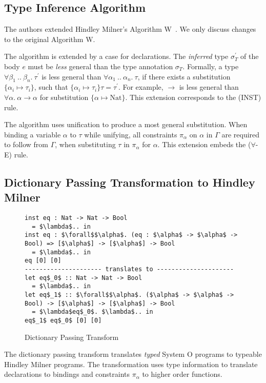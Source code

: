 \documentclass[runningheads]{llncs}
\newcommand{\snip}[1]{\footnotesize{\ttfamily{#1}}}
\begin{document}
\subsection{Type Inference Algorithm}
The authors extended Hindley Milner's Algorithm W~\cite{hm78}. We only discuss changes to the original Algorithm W.

The algorithm is extended by a case for \snip{inst} declarations. 
The \emph{inferred} type $\sigma_T^\prime$ of the body $e$ must be \emph{less} general than the type annotation $\sigma_T$. 
Formally, a type $\forall \beta_1 \ .. \ \beta_n. \ \tau^\prime$ is less general than $\forall \alpha_1 \ .. \ \alpha_n. \ \tau$, if there exists a substitution $\{\alpha_i \mapsto \tau_i\}$, such that $\{\alpha_i \mapsto \tau_i\}\tau = \tau^\prime$.  
For example, \snip{Nat} $\rightarrow$ \snip{Nat} is less general than $\forall \alpha. \ \alpha \rightarrow \alpha$ for substitution $\{\alpha \mapsto \text{Nat}\}$. This extension corresponds to the (INST) rule.

The algorithm uses unification to produce a most general substitution. 
When binding a variable $\alpha$ to $\tau$ while unifying, all constraints $\pi_\alpha$ on $\alpha$ in $\Gamma$ are required to follow from $\Gamma$, when substituting $\tau$ in $\pi_\alpha$ for $\alpha$. This extension embeds the ($\forall$-E) rule.

\subsection{Dictionary Passing Transformation to Hindley Milner}
\begin{figure}
  \begin{lstlisting}
inst eq : Nat -> Nat -> Bool 
  = $\lambda$.. in                 
inst eq : $\forall$$\alpha$. (eq : $\alpha$ -> $\alpha$ -> Bool) => [$\alpha$] -> [$\alpha$] -> Bool 
  = $\lambda$.. in
eq [0] [0]
--------------------- translates to ---------------------
let eq$_0$ :: Nat -> Nat -> Bool
  = $\lambda$.. in
let eq$_1$ :: $\forall$$\alpha$. ($\alpha$ -> $\alpha$ -> Bool) -> [$\alpha$] -> [$\alpha$] -> Bool     
  = $\lambda$eq$_0$. $\lambda$.. in
eq$_1$ eq$_0$ [0] [0]  
  \end{lstlisting}
  \caption{Dictionary Passing Transform} \label{transform}
\end{figure}
The dictionary passing transform translates \emph{typed} System O programs to typeable Hindley Milner programs. 
The transformation uses type information to translate \snip{inst} declarations to \snip{let} bindings and constraints $\pi_\alpha$ to higher order functions. 
\end{document}
